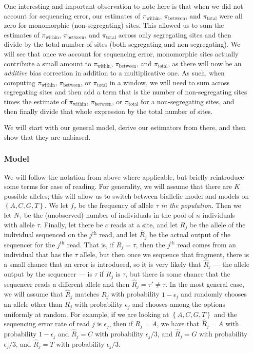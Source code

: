 \documentclass[a4paper,fontsize=9pt,DIV=14]{scrartcl}
\newcommand*{\piw}{$\pi_\text{within}$\xspace}
\newcommand*{\pib}{$\pi_\text{between}$\xspace}
\newcommand*{\pit}{$\pi_\text{total}$\xspace}
\begin{document}
One interesting and important observation to note here is that when we did not account for sequencing error, our estimates of \piw, \pib, and \pit were all zero for monomorphic (non-segregating) sites.  This allowed us to sum the estimates of \piw, \pib, and \pit across only segregating sites and then divide by the total number of sites (both segregating and non-segregating).  We will see that once we account for sequencing error, monomorphic sites actually contribute a small amount to \piw, \pib, and \pit, as there will now be an \emph{additive} bias correction in addition to a multiplicative one.  As such, when computing \piw, \pib, or \pit in a window, we will need to sum across segregating sites and then add a term that is the number of non-segregating sites times the estimate of \piw, \pib, or \pit for a non-segregating sites, and then finally divide that whole expression by the total number of sites.

We will start with our general model, derive our estimators from there, and then show that they are unbiased.  


\subsubsection*{Model}
\label{supp:sec:FST:sub:HeterozygositySequencingError:sub:Model}

We will follow the notation from above where applicable, but briefly reintroduce some terms for ease of reading.  For generality, we will assume that there are $K$ possible alleles; this will allow us to switch between biallelic model and models on $\left\{A, C, G, T\right\}$.  We let $f_\tau$ be the frequency of allele $\tau$ \emph{in the population}.  Then we let $N_\tau$ be the (unobserved) number of individuals in the pool of $n$ individuals with allele $\tau$.  Finally, let there be $c$ reads at a site, and let $R_j$ be the allele of the individual sequenced on the $j^\text{th}$ read, and let $\hat{R}_j$ be the actual output of the sequencer for the $j^\text{th}$ read.  That is, if $R_j = \tau$, then the $j^\text{th}$ read comes from an individual that has the $\tau$ allele, but then once we sequence that fragment, there is a small chance that an error is introduced, so it is very likely that $\hat{R}_j$ --- the allele output by the sequencer --- is $\tau$ if $R_j$ is $\tau$, but there is some chance that the sequencer reads a different allele and then $\hat{R}_j = \tau' \ne \tau$.  In the most general case, we will assume that $\hat{R}_j$ matches $R_j$ with probability $1 - \epsilon_j$ and randomly chooses an allele other than $R_j$ with probability $\epsilon_j$ and chooses among the options uniformly at random.  For example, if we are looking at  $\left\{A, C, G, T\right\}$ and the sequencing error rate of read $j$ is $\epsilon_j$, then if $R_j = A$, we have that $\hat{R}_j = A$ with probability $1 - \epsilon_j$ and $\hat{R}_j = C$ with probability $\epsilon_j/3$, and $\hat{R}_j = G$ with probability $\epsilon_j/3$, and $\hat{R}_j = T$ with probability $\epsilon_j/3$.
\end{document}
